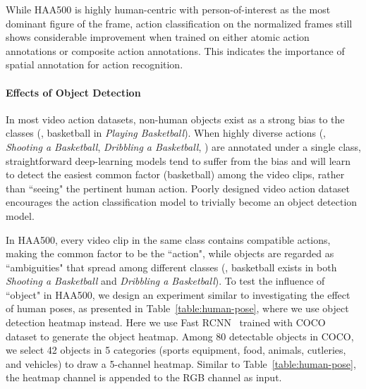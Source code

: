 \documentclass[10pt,twocolumn,letterpaper]{article}
\begin{document}
While HAA500 is highly human-centric with person-of-interest as the most dominant figure of the frame, action classification on the normalized frames still shows considerable improvement when trained on either atomic action annotations or composite action annotations. This indicates the importance of spatial annotation for  action recognition.

\vspace{-0.5em}
\paragraph{Effects of Object Detection} 
In most video action datasets, non-human objects exist as a strong bias to the classes (\eg, basketball in \textit{Playing Basketball}). 
When highly diverse actions (\eg, \textit{Shooting a Basketball}, \textit{Dribbling a Basketball}, \etc) are annotated under a single class, straightforward deep-learning models tend to suffer from the bias and will learn to detect the easiest common factor (basketball) among the video clips, rather than ``seeing" the pertinent human action. Poorly designed video action dataset encourages the action classification model to trivially become an object detection model. 

In HAA500, every video clip in the same class contains compatible actions, making the common factor to be the ``action", while objects are regarded as ``ambiguities" that spread among different classes (\eg, basketball exists in both \textit{Shooting a Basketball} and \textit{Dribbling a Basketball}). To test the influence of ``object" in HAA500, we design an experiment similar to investigating the effect of human poses, as presented in Table~\ref{table:human-pose}, where we use object detection heatmap instead. Here we use Fast RCNN~\cite{fastrcnn}  trained with COCO~\cite{coco} dataset to generate the object heatmap. Among 80 detectable objects in COCO, we select 42 objects in 5 categories (sports equipment, food, animals, cutleries, and vehicles) to draw a 5-channel heatmap. Similar to Table~\ref{table:human-pose}, the heatmap channel is appended to the RGB channel as input. 
\end{document}
